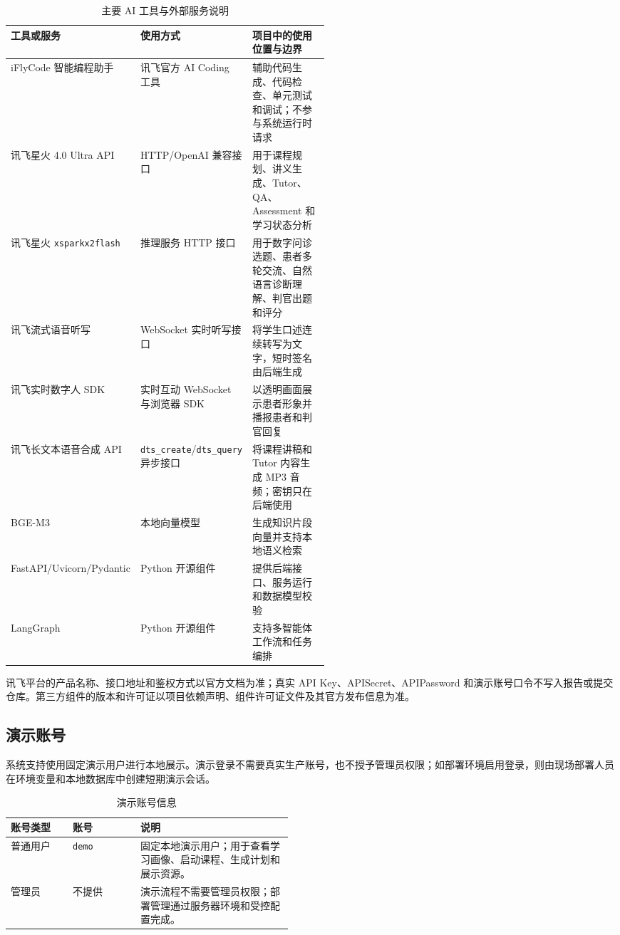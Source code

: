 \begin{table}[H]
  \centering
  \small
  \caption{主要 AI 工具与外部服务说明}
  \label{tab:ai-tools-and-services}
  \begin{tabularx}{\linewidth}{p{0.24\linewidth}p{0.28\linewidth}X}
    \toprule
    工具或服务 & 使用方式 & 项目中的使用位置与边界 \\
    \midrule
    iFlyCode 智能编程助手 & 讯飞官方 AI Coding 工具 & 辅助代码生成、代码检查、单元测试和调试；不参与系统运行时请求 \\
    讯飞星火 4.0 Ultra API & HTTP/OpenAI 兼容接口 & 用于课程规划、讲义生成、Tutor、QA、Assessment 和学习状态分析 \\
    讯飞星火 \texttt{xsparkx2flash} & 推理服务 HTTP 接口 & 用于数字问诊选题、患者多轮交流、自然语言诊断理解、判官出题和评分 \\
    讯飞流式语音听写 & WebSocket 实时听写接口 & 将学生口述连续转写为文字，短时签名由后端生成 \\
    讯飞实时数字人 SDK & 实时互动 WebSocket 与浏览器 SDK & 以透明画面展示患者形象并播报患者和判官回复 \\
    讯飞长文本语音合成 API & \texttt{dts\_create}/\texttt{dts\_query} 异步接口 & 将课程讲稿和 Tutor 内容生成 MP3 音频；密钥只在后端使用 \\
    BGE-M3 & 本地向量模型 & 生成知识片段向量并支持本地语义检索 \\
    FastAPI/Uvicorn/Pydantic & Python 开源组件 & 提供后端接口、服务运行和数据模型校验 \\
    LangGraph & Python 开源组件 & 支持多智能体工作流和任务编排 \\
    \bottomrule
  \end{tabularx}
\end{table}

讯飞平台的产品名称、接口地址和鉴权方式以官方文档为准；真实 API Key、APISecret、APIPassword 和演示账号口令不写入报告或提交仓库。第三方组件的版本和许可证以项目依赖声明、组件许可证文件及其官方发布信息为准。

\subsection*{演示账号}

系统支持使用固定演示用户进行本地展示。演示登录不需要真实生产账号，也不授予管理员权限；如部署环境启用登录，则由现场部署人员在环境变量和本地数据库中创建短期演示会话。

\begin{table}[H]
  \centering
  \caption{演示账号信息}
  \label{tab:demo-account}
  \begin{tabularx}{\linewidth}{p{0.22\linewidth}p{0.24\linewidth}X}
    \toprule
    账号类型 & 账号 & 说明 \\
    \midrule
    普通用户 & \texttt{demo} & 固定本地演示用户；用于查看学习画像、启动课程、生成计划和展示资源。 \\
    管理员 & 不提供 & 演示流程不需要管理员权限；部署管理通过服务器环境和受控配置完成。 \\
    \bottomrule
  \end{tabularx}
\end{table}

